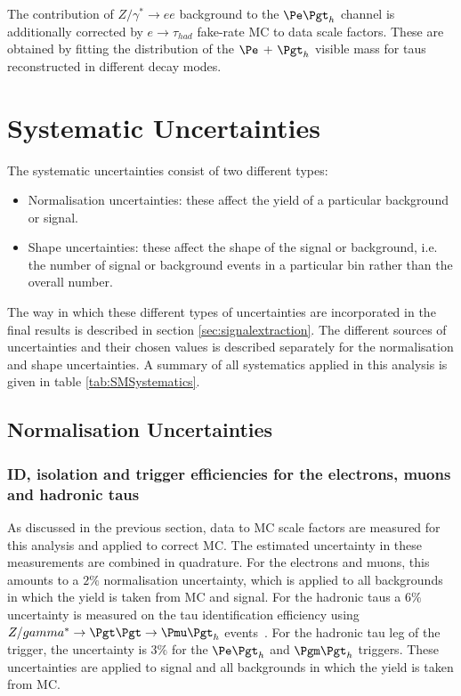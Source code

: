 The contribution of $Z/\gamma^{*} \to ee$ background to the $\etau$ channel
is additionally corrected by $e \to \tau_{had}$ fake-rate \ac{MC} to data
scale factors. These are obtained by fitting the distribution of the $\Pe$ +
$\Pgt_{h}$ visible mass for taus reconstructed in different decay modes. 

\section{Systematic Uncertainties}
\label{sec:systematics}

The systematic uncertainties consist of two different types:

\begin{itemize} 
\item Normalisation uncertainties: these affect the yield of a particular background or
signal.
\item Shape uncertainties: these affect the shape of the signal or background,
i.e. the number of signal or background events in a particular bin rather
than the overall number.
\end{itemize}

The way in which these different types of uncertainties are incorporated in the
final results is described in section \ref{sec:signalextraction}. The different
sources of uncertainties and their chosen values is described separately for the 
normalisation and shape uncertainties. A summary of all systematics applied in
this analysis is given in table \ref{tab:SMSystematics}.

\subsection{Normalisation Uncertainties}
\label{sec:systematicUncertainties_yield}

\subsubsection{\textbf{ID, isolation and trigger efficiencies for the electrons, muons and
hadronic taus}}
As discussed in the previous section, data to \ac{MC} scale factors are measured for this 
analysis and applied to correct \ac{MC}. The estimated uncertainty in these
measurements are combined in quadrature. For the electrons and muons, this
amounts to a $2\%$ normalisation uncertainty, which is applied to all
backgrounds in which the yield is taken from MC and signal.
For the hadronic taus a $6\%$ uncertainty
is measured on the tau identification efficiency using 
$Z/\gamma^{*} \to \Pgt\Pgt \to \Pmu\Pgt_{h}$ events~\cite{Chatrchyan:2012zz}. 
For the hadronic tau leg of the trigger, the uncertainty is $3\%$ for the $\etau$ and $\mutau$ triggers.
These uncertainties are applied to signal and all backgrounds in which the yield
is taken from \ac{MC}.

